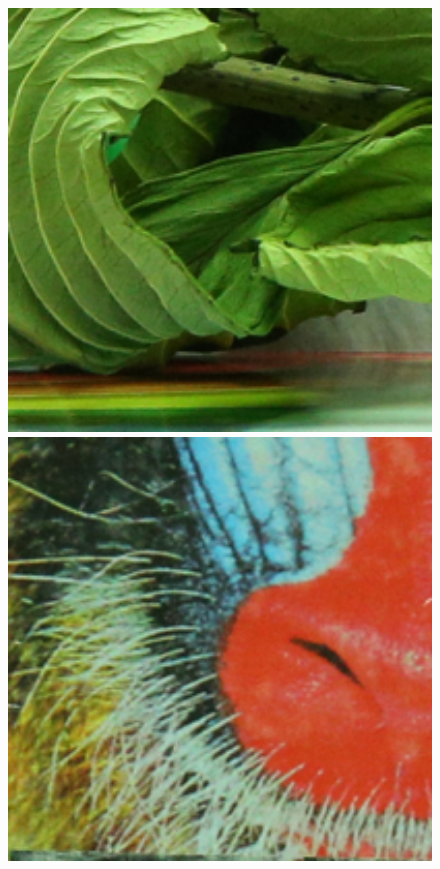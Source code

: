 \documentclass[10pt,twocolumn,letterpaper,sort&compress]{article}
\begin{document}
\begin{figure}
{\begin{minipage}{0.085\textwidth}
\includegraphics[width=1\textwidth]{CC15images/resize_5dmark3_iso3200_2_real.png}
\end{minipage}
\begin{minipage}{0.085\textwidth}
\includegraphics[width=1\textwidth]{CC15images/resize_5dmark3_iso3200_3_real.png}

\end{minipage}}
\end{figure}
\end{document}
